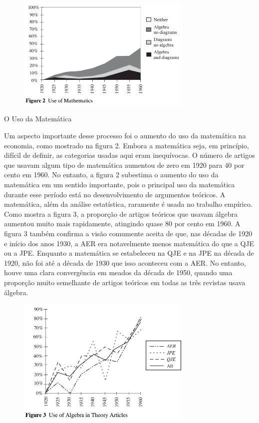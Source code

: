 \documentclass[12pt]{article}
\begin{document}
 \begin{figure}[H]
    \centering
    \includegraphics[width=0.75\textwidth]{4º Período/História do Pensamento Econômico/Tradução HPE/Tradução Tópico 7.2/figure 2.png}
    \end{figure}

O Uso da Matemática

Um aspecto importante desse processo foi o aumento do uso da matemática na economia, como mostrado na figura 2. Embora a matemática seja, em princípio, difícil de definir, as categorias usadas aqui eram inequívocas. O número de artigos que usavam algum tipo de matemática aumentou de zero em 1920 para 40 por cento em 1960. No entanto, a figura 2 subestima o aumento do uso da matemática em um sentido importante, pois o principal uso da matemática durante esse período está no desenvolvimento de argumentos teóricos. A matemática, além da análise estatística, raramente é usada no trabalho empírico. Como mostra a figura 3, a proporção de artigos teóricos que usavam álgebra aumentou muito mais rapidamente, atingindo quase 80 por cento em 1960. A figura 3 também confirma a visão comumente aceita de que, nas décadas de 1920 e início dos anos 1930, a AER era notavelmente menos matemática do que a QJE ou a JPE. Enquanto a matemática se estabeleceu na QJE e na JPE na década de 1920, não foi até a década de 1930 que isso aconteceu com a AER. No entanto, houve uma clara convergência em meados da década de 1950, quando uma proporção muito semelhante de artigos teóricos em todas as três revistas usava álgebra.

 \begin{figure}[H]
    \centering
    \includegraphics[width=0.75\textwidth]{4º Período/História do Pensamento Econômico/Tradução HPE/Tradução Tópico 7.2/figure 3.png}
    \end{figure}
\end{document}
